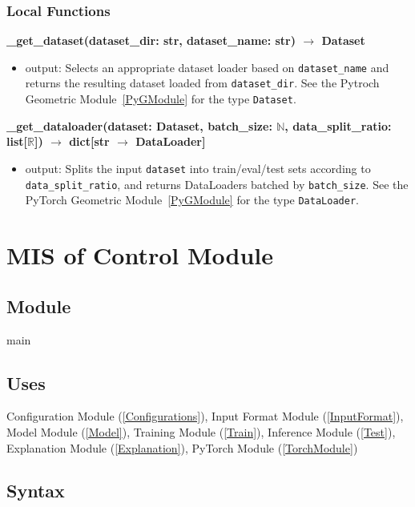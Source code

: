 \documentclass[12pt, titlepage]{article}
\begin{document}
\subsubsection{Local Functions}

\noindent \textbf{\_get\_dataset(dataset\_dir: str, dataset\_name: str) $\rightarrow$ Dataset}
\begin{itemize}
  \item output: Selects an appropriate dataset loader based on \texttt{dataset\_name} and returns the resulting dataset loaded from \texttt{dataset\_dir}. See the Pytroch Geometric Module~\ref{PyGModule} for the type \texttt{Dataset}.
\end{itemize}

\noindent \textbf{\_get\_dataloader(dataset: Dataset, batch\_size: \(\mathbb{N}\), data\_split\_ratio: list[\(\mathbb{R}\)]) $\rightarrow$ dict[str $\rightarrow$ DataLoader]}
\begin{itemize}
  \item output: Splits the input \texttt{dataset} into train/eval/test sets according to \texttt{data\_split\_ratio}, and returns DataLoaders batched by \texttt{batch\_size}. See the PyTorch Geometric Module~\ref{PyGModule} for the type \texttt{DataLoader}.
\end{itemize}



\newpage










\section{MIS of Control Module} \label{Control}

\subsection{Module}
main

\subsection{Uses}
Configuration Module (\ref{Configurations}), Input Format Module (\ref{InputFormat}), Model Module (\ref{Model}), Training Module (\ref{Train}), Inference Module (\ref{Test}), Explanation Module (\ref{Explanation}), PyTorch Module (\ref{TorchModule})

\subsection{Syntax}
\end{document}
